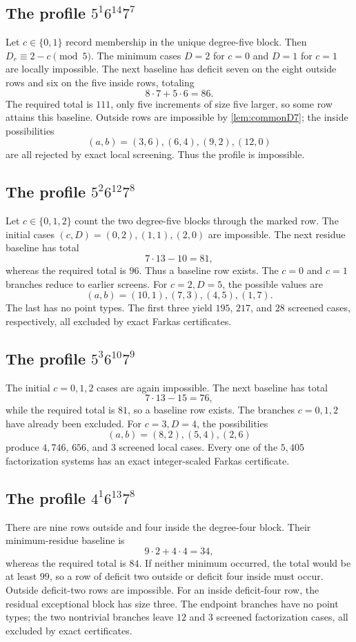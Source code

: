 \documentclass[11pt]{amsart}
\begin{document}
\subsection{The profile $5^1 6^{14}7^7$}
Let $c\in\{0,1\}$ record membership in the unique degree-five block. Then $D_r\equiv2-c\pmod5$. The minimum cases $D=2$ for $c=0$ and $D=1$ for $c=1$ are locally impossible. The next baseline has deficit seven on the eight outside rows and six on the five inside rows, totaling
\[
 8\cdot7+5\cdot6=86.
\]
The required total is $111$, only five increments of size five larger, so some row attains this baseline. Outside rows are impossible by \cref{lem:commonD7}; the inside possibilities
\[
 (a,b)=(3,6),(6,4),(9,2),(12,0)
\]
are all rejected by exact local screening. Thus the profile is impossible.

\subsection{The profile $5^2 6^{12}7^8$}
Let $c\in\{0,1,2\}$ count the two degree-five blocks through the marked row. The initial cases $(c,D)=(0,2),(1,1),(2,0)$ are impossible. The next residue baseline has total
\[
 7\cdot13-10=81,
\]
whereas the required total is $96$. Thus a baseline row exists. The $c=0$ and $c=1$ branches reduce to earlier screens. For $c=2,D=5$, the possible values are
\[
 (a,b)=(10,1),(7,3),(4,5),(1,7).
\]
The last has no point types. The first three yield $195$, $217$, and $28$ screened cases, respectively, all excluded by exact Farkas certificates.

\subsection{The profile $5^3 6^{10}7^9$}
The initial $c=0,1,2$ cases are again impossible. The next baseline has total
\[
 7\cdot13-15=76,
\]
while the required total is $81$, so a baseline row exists. The branches $c=0,1,2$ have already been excluded. For $c=3,D=4$, the possibilities
\[
 (a,b)=(8,2),(5,4),(2,6)
\]
produce $4{,}746$, $656$, and $3$ screened local cases. Every one of the $5{,}405$ factorization systems has an exact integer-scaled Farkas certificate.

\subsection{The profile $4^1 6^{13}7^8$}
There are nine rows outside and four inside the degree-four block. Their minimum-residue baseline is
\[
 9\cdot2+4\cdot4=34,
\]
whereas the required total is $84$. If neither minimum occurred, the total would be at least $99$, so a row of deficit two outside or deficit four inside must occur. Outside deficit-two rows are impossible. For an inside deficit-four row, the residual exceptional block has size three. The endpoint branches have no point types; the two nontrivial branches leave $12$ and $3$ screened factorization cases, all excluded by exact certificates.
\end{document}
